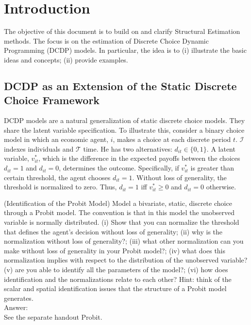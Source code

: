 \section{Introduction} \label{section:intro}
\noindent The objective of this document is to build on \citet{keane2011structural} and clarify Structural Estimation methods. The focus is on the estimation of Discrete Choice Dynamic Programming (DCDP) models. In particular, the idea is to (i) illustrate the basic ideas and concepts; (ii) provide examples.\\

\subsection{DCDP as an Extension of the Static Discrete Choice Framework} \label{section:extension}
DCDP models are a natural generalization of static discrete choice models. They share the latent variable specification. To illustrate this, consider a binary choice model in which an economic agent, $i$, makes a choice at each discrete period $t$. $\mathcal{I}$ indexes individuals and $\mathcal{T}$ time. He has two alternatives: $d_{it} \in \{ 0,1\}$. A latent variable, $v_{it}^*$, which is the difference in the expected payoffs between the choices $d_{it} = 1$ and $d_{it} = 0$, determines the outcome. Specifically, if $v_{it}^*$ is greater than certain threshold, the agent chooses $d_{it} = 1$. Without loss of generality, the threshold is normalized to zero. Thus, $d_{it} = 1$ iff $v_{it}^* \geq 0$ and $d_{it} = 0$ otherwise.\\
\begin{exercise} (Identification of the Probit Model) \label{exercise:idenprobit}
Model a bivariate, static, discrete choice through a Probit model. The convention is that in this model the unobserved variable is normally distributed. (i) Show that you can normalize the threshold that defines the agent's decision without loss of generality;  (ii) why is the normalization without loss of generality?; (iii) what other normalization can you make without loss of generality in your Probit model?; (iv) what does this normalization implies with respect to the distribution of the unobserved variable? (v) are you able to identify all the parameters of the model?; (vi) how does identification and the normalizations relate to each other? Hint: think of the scalar and spatial identification issues that the structure of a Probit model generates.\\
\noindent Answer:\\
\noindent See the separate handout Probit. 
\end{exercise}

